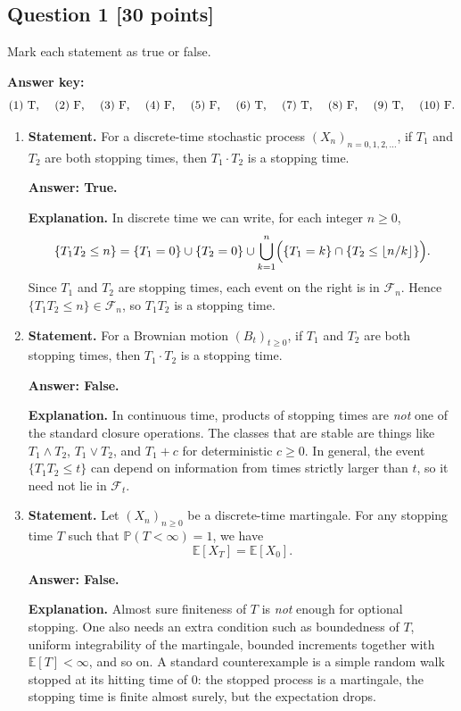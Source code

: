 \documentclass[11pt]{article}
\theoremstyle{definition}
\begin{document}
\subsection*{Question 1 \hfill [30 points]}
Mark each statement as true or false.

\begin{summarybox}
\textbf{Answer key:}
\[
\text{(1) T, \quad (2) F, \quad (3) F, \quad (4) F, \quad (5) F, \quad (6) T, \quad (7) T, \quad (8) F, \quad (9) T, \quad (10) F.}
\]
\end{summarybox}

\begin{enumerate}[label=(\arabic*)]
    \item \textbf{Statement.} For a discrete-time stochastic process \((X_n)_{n=0,1,2,\dots}\), if \(T_1\) and \(T_2\) are both stopping times, then \(T_1\cdot T_2\) is a stopping time.

    \textbf{Answer: True.}

    \textbf{Explanation.} In discrete time we can write, for each integer \(n\ge 0\),
    \[
    \{T_1T_2\le n\}
    =
    \{T_1=0\}\cup \{T_2=0\}
    \cup
    \bigcup_{k=1}^n \Bigl(\{T_1=k\}\cap \{T_2\le \lfloor n/k\rfloor\}\Bigr).
    \]
    Since \(T_1\) and \(T_2\) are stopping times, each event on the right is in \(\mathcal F_n\). Hence \(\{T_1T_2\le n\}\in \mathcal F_n\), so \(T_1T_2\) is a stopping time.

    \item \textbf{Statement.} For a Brownian motion \((B_t)_{t\ge 0}\), if \(T_1\) and \(T_2\) are both stopping times, then \(T_1\cdot T_2\) is a stopping time.

    \textbf{Answer: False.}

    \textbf{Explanation.} In continuous time, products of stopping times are \emph{not} one of the standard closure operations. The classes that are stable are things like \(T_1\wedge T_2\), \(T_1\vee T_2\), and \(T_1+c\) for deterministic \(c\ge 0\). In general, the event \(\{T_1T_2\le t\}\) can depend on information from times strictly larger than \(t\), so it need not lie in \(\mathcal F_t\).

    \item \textbf{Statement.} Let \((X_n)_{n\ge 0}\) be a discrete-time martingale. For any stopping time \(T\) such that \(\mathbb P(T<\infty)=1\), we have
    \[
    \mathbb E[X_T]=\mathbb E[X_0].
    \]

    \textbf{Answer: False.}

    \textbf{Explanation.} Almost sure finiteness of \(T\) is \emph{not} enough for optional stopping. One also needs an extra condition such as boundedness of \(T\), uniform integrability of the martingale, bounded increments together with \(\mathbb E[T]<\infty\), and so on. A standard counterexample is a simple random walk stopped at its hitting time of \(0\): the stopped process is a martingale, the stopping time is finite almost surely, but the expectation drops.


\end{enumerate}
\end{document}
